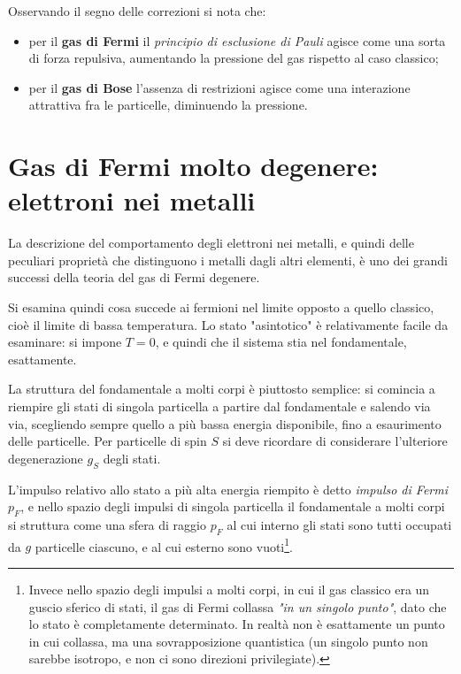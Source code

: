 Osservando il segno delle correzioni si nota che:
\begin{itemize}
	\item per il \textbf{gas di Fermi} il \textit{principio di esclusione di Pauli} agisce come una sorta di forza repulsiva, aumentando la pressione del gas rispetto al caso classico;
	\item per il \textbf{gas di Bose} l'assenza di restrizioni agisce come una interazione attrattiva fra le particelle, diminuendo la pressione.
\end{itemize}

\section{Gas di Fermi molto degenere: elettroni nei metalli}
\label{sec:fermigas}
La descrizione del comportamento degli elettroni nei metalli, e quindi delle peculiari proprietà che distinguono i metalli dagli altri elementi, è uno dei grandi successi della teoria del gas di Fermi degenere.
\newline

Si esamina quindi cosa succede ai fermioni nel limite opposto a quello classico, cioè il limite di bassa temperatura.
Lo stato "asintotico" è relativamente facile da esaminare: si impone $T=0$, e quindi che il sistema stia nel fondamentale, esattamente.

La struttura del fondamentale a molti corpi è piuttosto semplice: si comincia a riempire gli stati di singola particella a partire dal fondamentale e salendo via via, scegliendo sempre quello a più bassa energia disponibile, fino a esaurimento delle particelle. Per particelle di spin $S$ si deve ricordare di considerare l'ulteriore degenerazione $g_S$ degli stati.

L'impulso relativo allo stato a più alta energia riempito è detto \textit{impulso di Fermi} $p_F$, e nello spazio degli impulsi di singola particella il fondamentale a molti corpi si struttura come una sfera di raggio $p_F$ al cui interno gli stati sono tutti occupati da $g$ particelle ciascuno, e al cui esterno sono vuoti\footnote{Invece nello spazio degli impulsi a molti corpi, in cui il gas classico era un guscio sferico di stati, il gas di Fermi collassa \textit{"in un singolo punto"}, dato che lo stato è completamente determinato. In realtà non è esattamente un punto in cui collassa, ma una sovrapposizione quantistica (un singolo punto non sarebbe isotropo, e non ci sono direzioni privilegiate).}.

